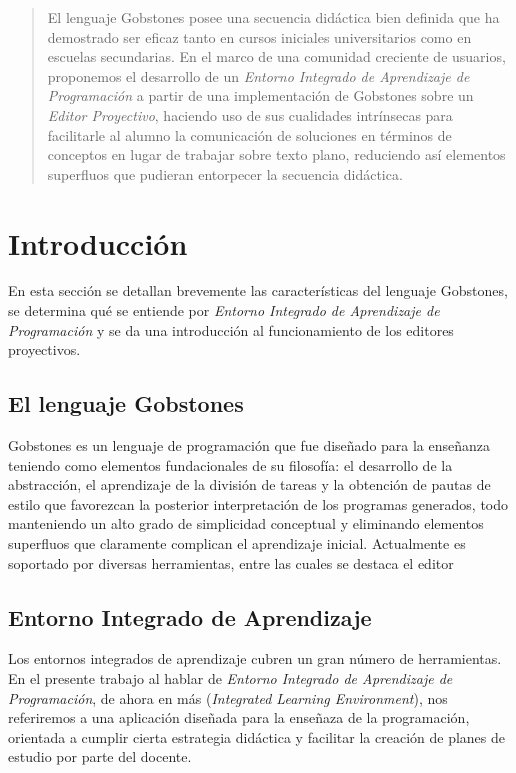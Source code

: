 \begin{abstract}
El lenguaje Gobstones posee una secuencia didáctica bien definida que ha demostrado ser eficaz tanto en cursos iniciales universitarios como en escuelas secundarias. En el marco de una comunidad creciente de usuarios, proponemos el desarrollo de un \textit{Entorno Integrado de Aprendizaje de Programación} a partir de una implementación de Gobstones sobre un \textit{Editor Proyectivo}, haciendo uso de sus cualidades intrínsecas para facilitarle al alumno la comunicación de soluciones en términos de conceptos en lugar de trabajar sobre texto plano, reduciendo así elementos superfluos que pudieran entorpecer la secuencia didáctica.
\end{abstract}


\section{Introducción}

En esta sección se detallan brevemente las características del lenguaje Gobstones, se determina qué se entiende por \textit{Entorno Integrado de Aprendizaje de Programación} y se da una introducción al funcionamiento de los editores proyectivos.


\subsection{El lenguaje Gobstones}

Gobstones es un lenguaje de programación que fue diseñado para la enseñanza teniendo como elementos fundacionales de su filosofía: el desarrollo de la abstracción, el aprendizaje de la división de tareas y la obtención de pautas de estilo que favorezcan la posterior interpretación de los programas generados, todo manteniendo un alto grado de simplicidad conceptual y eliminando elementos superfluos que claramente complican el aprendizaje inicial. 
Actualmente es soportado por diversas herramientas, entre las cuales se destaca el editor \cite{PyGobstones}

\subsection{Entorno Integrado de Aprendizaje}

Los entornos integrados de aprendizaje\cite{IntegratedLearningEnvironment} cubren un gran número de herramientas. En el presente trabajo al hablar de \textit{Entorno Integrado de Aprendizaje de Programación}, de ahora en más \ile (\textit{Integrated Learning Environment}), nos referiremos a una aplicación diseñada para la enseñaza de la programación, orientada a cumplir cierta estrategia didáctica y facilitar la creación de planes de estudio por parte del docente. 

